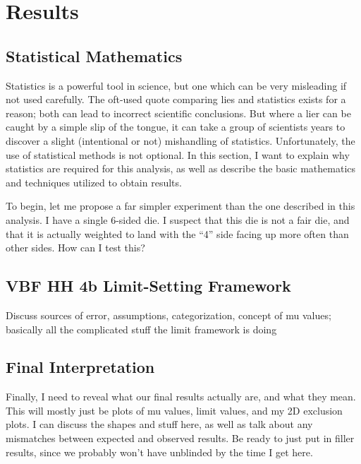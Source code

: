 \chapter{Results}

\section{Statistical Mathematics}

    Statistics is a powerful tool in science,
        but one which can be very misleading if not used carefully.
    The oft-used quote comparing lies and statistics exists for a reason;
        both can lead to incorrect scientific conclusions.
    But where a lier can be caught by a simple slip of the tongue,
        it can take a group of scientists years to discover a slight (intentional or not) mishandling of statistics.
    Unfortunately, the use of statistical methods is not optional.
    In this section, I want to explain why statistics are required for this analysis,
        as well as describe the basic mathematics and techniques utilized to obtain results.

    To begin, let me propose a far simpler experiment than the one described in this analysis.
    I have a single 6-sided die.
    I suspect that this die is not a fair die,
        and that it is actually weighted to land with the ``4'' side facing up more often than other sides.
    How can I test this?
        


\section{VBF \to HH \to 4b Limit-Setting Framework}

    Discuss sources of error, assumptions, categorization, concept of mu values;
    basically all the complicated stuff the limit framework is doing

\section{Final Interpretation}

    Finally, I need to reveal what our final results actually are, and what they mean.
    This will mostly just be plots of mu values, limit values, and my 2D exclusion plots.
    I can discuss the shapes and stuff here, as well as talk about any mismatches between expected and observed results.
    Be ready to just put in filler results, since we probably won't have unblinded by the time I get here.


